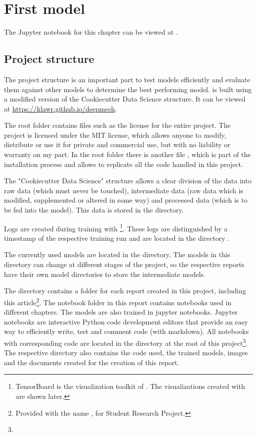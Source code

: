 \section{First model}

The Jupyter notebook for this chapter can be viewed at .

\subsection{Project structure}

The project structure is an important part to test models efficiently and evaluate them against other models to determine the best performing model.
 is built using a modified version of the Cookiecutter Data Science \cite{drivendata2019} structure. It can be viewed at \url{https://klawr.github.io/deepmech}.

The root folder contains files such as the license for the entire project.
The project is licensed under the MIT license, which allows anyone to modify, distribute or use it for private and commercial use, but with no liability or warranty on my part.
In the root folder there is another file , which is part of the installation process and allows to replicate all the code handled in this project.

The "Cookiecutter Data Science" structure allows a clear division of the data into raw data (which must never be touched), intermediate data (raw data which is modified, supplemented or altered in some way) and processed data (which is to be fed into the model).
This data is stored in the  directory.

Logs are created during training with \footnote{TensorBoard is the visualization toolkit of . The visualizations created with  are shown later.}.
These logs are distinguished by a timestamp of the respective training run and are located in the directory .

The currently used models are located in the  directory.
The models in this directory can change at different stages of the project, so the respective reports have their own model directories to store the intermediate models.

The  directory contains a folder for each report created in this project, including this article\footnote{Provided with the name , for Student Research Project.}.
The notebook folder in this report contains  notebooks \cite{Jupyter2019} used in different chapters.
The models are also trained in jupyter notebooks. 
Jupyter notebooks are interactive Python code development editors that provide an easy way to efficiently write, test and comment code (with markdown).
All notebooks with corresponding code are located in the  directory at the root of this project\footnote{}.
The respective directory also contains the code used, the trained models, images and the documents created for the creation of this report.

